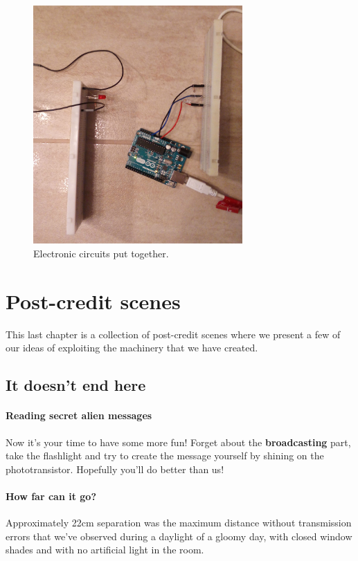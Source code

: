 \documentclass[10pt]{report}
\begin{document}
\begin{figure}[H]
\centering\includegraphics[width=8cm]{circuits}
\caption{Electronic circuits put together.}				
\label{fig:circuits_pic}
\end{figure}



\chapter{Post-credit scenes}

This last chapter is a collection of post-credit scenes where we present a few of our ideas of exploiting the machinery that we have created.

\section{It doesn't end here}



\subsubsection{Reading secret alien messages}

Now it's your time to have some more fun! Forget about the \textbf{broadcasting} part, take the flashlight and try to create the message yourself by shining on the phototransistor. Hopefully you'll do better than us!


\subsubsection{How far can it go?}

Approximately 22cm separation was the maximum distance without transmission errors that we've observed during a daylight of a gloomy day, with closed window shades and with no artificial light in the room. 
\end{document}
